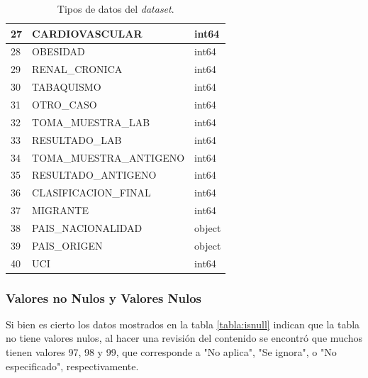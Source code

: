 \begin{table}[h]
{\begin{tabular}{|l|l|l|}
27 & CARDIOVASCULAR          & int64      \\ \hline
28 & OBESIDAD                & int64      \\ \hline
29 & RENAL\_CRONICA          & int64      \\ \hline
30 & TABAQUISMO              & int64      \\ \hline
31 & OTRO\_CASO              & int64      \\ \hline
32 & TOMA\_MUESTRA\_LAB      & int64      \\ \hline
33 & RESULTADO\_LAB          & int64      \\ \hline
34 & TOMA\_MUESTRA\_ANTIGENO & int64      \\ \hline
35 & RESULTADO\_ANTIGENO     & int64      \\ \hline
36 & CLASIFICACION\_FINAL    & int64      \\ \hline
37 & MIGRANTE                & int64      \\ \hline
38 & PAIS\_NACIONALIDAD      & object     \\ \hline
39 & PAIS\_ORIGEN            & object     \\ \hline
40 & UCI                     & int64      \\ \hline
\end{tabular}
}
\caption{Tipos de datos del \emph{dataset}.}
\label{tabla:datatype}
\end{table}

\clearpage
\subsubsection{Valores no Nulos y Valores Nulos}
Si bien es cierto los datos mostrados en la tabla \ref{tabla:isnull} indican que la tabla no tiene valores nulos, al hacer una revisión del contenido
se encontró que muchos tienen valores 97, 98 y 99, que corresponde a "No aplica", "Se ignora", o "No especificado", respectivamente. 

